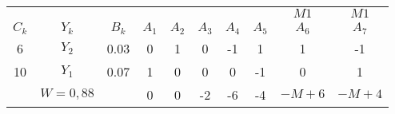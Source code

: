     \begin{tabular}{cccccccccc}
    \hline
    \hline
            &         &         &         &         &         &         &         & $M1$    & $M1$ \bigstrut[t]\\
    $C_k$   & $Y_k$   & $B_k$   & $A_1$   & $A_2$   & $A_3$   & $A_4$   & $A_5$   & $A_6$   & $A_7$ \bigstrut[b]\\
    \hline
    6       & $Y_2$   & 0.03    & 0       & 1       & 0       & -1      & 1       & 1       & -1 \bigstrut[t]\\
    10      & $Y_1$   & 0.07    & 1       & 0       & 0       & 0       & -1      & 0       & 1 \bigstrut[b]\\
    \hline
            & $W=0,88$ &         & 0       & 0       & -2      & -6      & -4      & $-M+6$  & $-M+4$ \bigstrut\\
    \hline
    \hline
    \end{tabular}%
